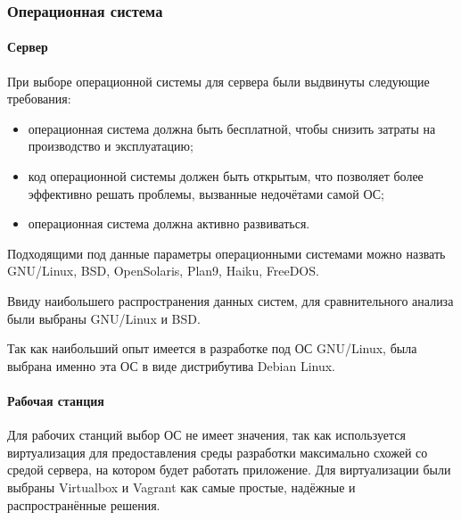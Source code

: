 \subsubsection{Операционная система}

\paragraph{Сервер}

При выборе операционной системы для сервера были выдвинуты следующие требования:
\begin{itemize}
\item операционная система должна быть бесплатной, чтобы снизить затраты на производство и эксплуатацию;
\item код операционной системы должен быть открытым, что позволяет более эффективно решать проблемы, вызванные недочётами самой ОС;
\item операционная система должна активно развиваться.
\end{itemize}

Подходящими под данные параметры операционными системами можно назвать GNU/Linux, BSD, OpenSolaris, Plan9, Haiku, FreeDOS.

Ввиду наибольшего распространения данных систем, для сравнительного анализа были выбраны GNU/Linux и BSD.

Так как наибольший опыт имеется в разработке под ОС GNU/Linux, была выбрана именно эта ОС в виде дистрибутива Debian Linux.

\paragraph{Рабочая станция}

Для рабочих станций выбор ОС не имеет значения, так как используется виртуализация для предоставления среды разработки максимально схожей со средой сервера, на котором будет работать приложение. Для виртуализации были выбраны Virtualbox и Vagrant как самые простые, надёжные и распространённые решения.

